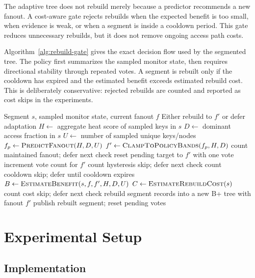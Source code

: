 \documentclass[sigconf,screen]{acmart}
\begin{document}
The adaptive tree does not rebuild merely because a predictor recommends a new
fanout.  A cost-aware gate rejects rebuilds when the expected benefit is too
small, when evidence is weak, or when a segment is inside a cooldown period.
This gate reduces unnecessary rebuilds, but it does not remove ongoing access
path costs.

Algorithm~\ref{alg:rebuild-gate} gives the exact decision flow used by the
segmented tree.  The policy first summarizes the sampled monitor state, then
requires directional stability through repeated votes.  A segment is rebuilt
only if the cooldown has expired and the estimated benefit exceeds estimated
rebuild cost.  This is deliberately conservative: rejected rebuilds are
counted and reported as cost skips in the experiments.

\begin{algorithm}[t]
\caption{Cost-aware fanout rebuild gate}
\label{alg:rebuild-gate}
\begin{algorithmic}[1]
\Require Segment $s$, sampled monitor state, current fanout $f$
\Ensure Either rebuild to $f'$ or defer adaptation
\State $H \gets$ aggregate heat score of sampled keys in $s$
\State $D \gets$ dominant access fraction in $s$
\State $U \gets$ number of sampled unique keys/nodes
\State $f_p \gets \textsc{PredictFanout}(H,D,U)$
\State $f' \gets \textsc{ClampToPolicyBands}(f_p,H,D)$
  \State count maintained fanout; defer next check
  \State \Return
\EndIf
{}
  \State reset pending target to $f'$ with one vote
\Else
  \State increment vote count for $f'$
\EndIf
{}
  \State count hysteresis skip; defer next check
  \State \Return
\EndIf
{}
  \State count cooldown skip; defer until cooldown expires
  \State \Return
\EndIf
\State $B \gets \textsc{EstimateBenefit}(s,f,f',H,D,U)$
\State $C \gets \textsc{EstimateRebuildCost}(s)$
  \State count cost skip; defer next check
  \State \Return
\EndIf
\State rebuild segment records into a new B+ tree with fanout $f'$
\State publish rebuilt segment; reset pending votes
\end{algorithmic}
\end{algorithm}

\section{Experimental Setup}

\subsection{Implementation}
\end{document}
